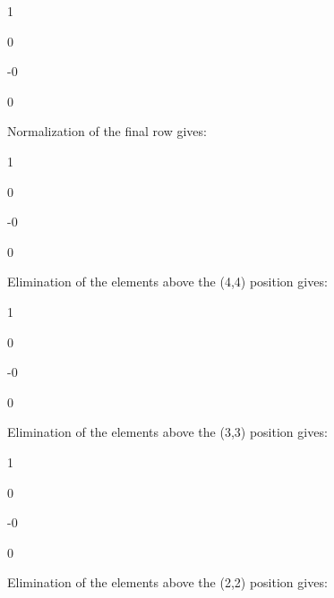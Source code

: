 \documentclass{article}
\begin{document}
1\qquad \TEXTsymbol{\vert}\qquad

0\qquad \TEXTsymbol{\vert}\qquad

-0\qquad \TEXTsymbol{\vert}\qquad

0\qquad \TEXTsymbol{\vert}\qquad

Normalization of the final row gives:

1\qquad \TEXTsymbol{\vert}\qquad

0\qquad \TEXTsymbol{\vert}\qquad

-0\qquad \TEXTsymbol{\vert}\qquad

0\qquad \TEXTsymbol{\vert}\qquad

Elimination of the elements above the (4,4) position gives:

1\qquad \TEXTsymbol{\vert}\qquad

0\qquad \TEXTsymbol{\vert}\qquad

-0\qquad \TEXTsymbol{\vert}\qquad

0\qquad \TEXTsymbol{\vert}\qquad

Elimination of the elements above the (3,3) position gives:

1\qquad \TEXTsymbol{\vert}\qquad

0\qquad \TEXTsymbol{\vert}\qquad

-0\qquad \TEXTsymbol{\vert}\qquad

0\qquad \TEXTsymbol{\vert}\qquad

Elimination of the elements above the (2,2) position gives:
\end{document}
